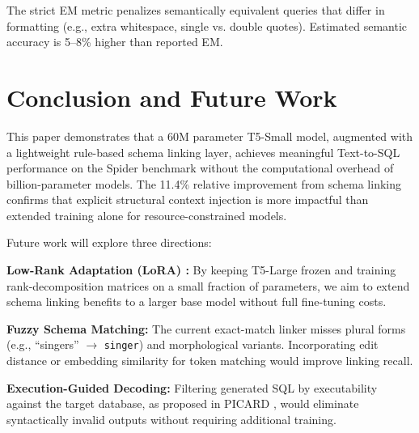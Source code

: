 \documentclass[conference]{IEEEtran}
\begin{document}
The strict EM metric penalizes semantically equivalent queries that differ in formatting (e.g., extra whitespace, single vs. double quotes). Estimated semantic accuracy is 5–8\% higher than reported EM.

\section{Conclusion and Future Work}

This paper demonstrates that a 60M parameter T5-Small model, augmented with a lightweight rule-based schema linking layer, achieves meaningful Text-to-SQL performance on the Spider benchmark without the computational overhead of billion-parameter models. The 11.4\% relative improvement from schema linking confirms that explicit structural context injection is more impactful than extended training alone for resource-constrained models.

Future work will explore three directions:

\textbf{Low-Rank Adaptation (LoRA) \cite{hu2021lora}:} By keeping T5-Large frozen and training rank-decomposition matrices on a small fraction of parameters, we aim to extend schema linking benefits to a larger base model without full fine-tuning costs.

\textbf{Fuzzy Schema Matching:} The current exact-match linker misses plural forms (e.g., ``singers'' $\rightarrow$ \texttt{singer}) and morphological variants. Incorporating edit distance or embedding similarity for token matching would improve linking recall.

\textbf{Execution-Guided Decoding:} Filtering generated SQL by executability against the target database, as proposed in PICARD \cite{scholak2021picard}, would eliminate syntactically invalid outputs without requiring additional training.
\end{document}
